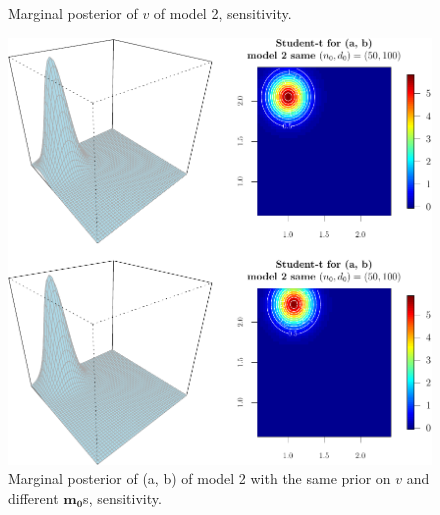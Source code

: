 \documentclass[12pt]{article}\usepackage[]{graphicx}\usepackage[]{color}
\newenvironment{knitrout}{}{} %
\begin{document}
\begin{enumerate}
\begin{enumerate}
\begin{knitrout}
\begin{figure}
{}

\caption[Marginal posterior of $v$ of model 2, sensitivity]{Marginal posterior of $v$ of model 2, sensitivity.}\label{fig:Q4f2senv}
\end{figure}


\end{knitrout}
\begin{knitrout}
\color{fgcolor}\begin{figure}

{\centering \includegraphics[width=.8\linewidth]{figure/hw1_Q4f2senab1-1} 

}

\caption[Marginal posterior of (a, b) of model 2 with the same prior on $v$ and different $\mathbf{m_0}$s, sensitivity]{Marginal posterior of (a, b) of model 2 with the same prior on $v$ and different $\mathbf{m_0}$s, sensitivity.}\label{fig:Q4f2senab1}
\end{figure}


\end{knitrout}
\begin{knitrout}
\color{fgcolor}\begin{figure}


\end{figure}
\end{knitrout}
\end{enumerate}
\end{enumerate}
\end{document}
